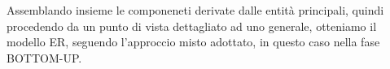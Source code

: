 Assemblando insieme le componeneti derivate dalle entità principali, quindi procedendo da un punto di vista dettagliato ad uno generale, otteniamo il modello ER, seguendo l'approccio misto adottato, in questo caso nella fase BOTTOM-UP. 

\noindent{}

